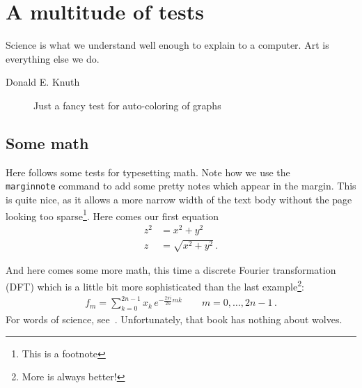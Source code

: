 \chapter{A multitude of tests}

\epigraph{Science is what we understand well enough to explain to a computer. Art is everything else we do.}{Donald E. Knuth}

\blindtext

\begin{figure}
    \small
    \centering
    \caption{Just a fancy test for auto-coloring of graphs}
\end{figure}

\section{Some math}

Here follows some tests for typesetting math. Note how we use the \texttt{\\marginnote} command to add some pretty notes which appear in the margin. This is quite nice, as it allows a more narrow width of the text body without the page looking too sparse\footnote{This is a footnote}. Here comes our first equation
\begin{align}
  z^2 &= x^2 + y^2 \\
  z &= \sqrt{x^2 + y^2} \,.
\end{align}

\pagebreak
{}
And here comes some more math, this time a discrete Fourier transformation (DFT)  which is a little bit more sophisticated than the last example\footnote{More is always better!}:
\begin{align}
	f_m =  \sum_{k=0}^{2n-1} x_k \, e^{-\frac{2\pi i}{2n} mk } \label{eqn:dft}
\qquad
m = 0,\dotsc,2n-1 \,.
\end{align}
For words of science, see~\cite{botsch2010polygon}. Unfortunately, that book has nothing about wolves.

